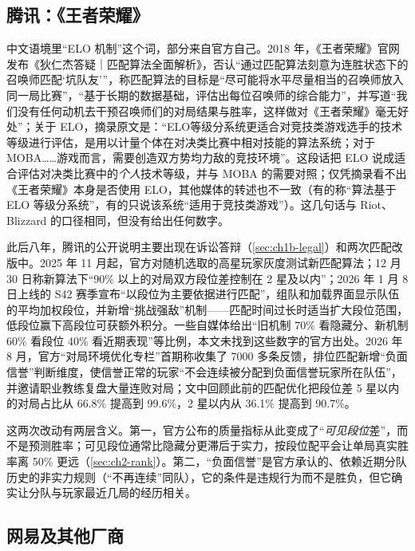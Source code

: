 \subsection{腾讯：《王者荣耀》}
\label{sec:ch1b-tencent}

中文语境里“ELO 机制”这个词，部分来自官方自己。2018 年，《王者荣耀》官网发布《狄仁杰答疑｜匹配算法全面解析》，否认“通过匹配算法刻意为连胜状态下的召唤师匹配‘坑队友’”，称匹配算法的目标是“尽可能将水平尽量相当的召唤师放入同一局比赛”，“基于长期的数据基础，评估出每位召唤师的综合能力”，并写道“我们没有任何动机去干预召唤师们的对局结果与胜率，这样做对《王者荣耀》毫无好处”；关于 ELO，摘录原文是：“ELO等级分系统更适合对竞技类游戏选手的技术等级进行评估，是用以计量个体在对决类比赛中相对技能的算法系统；对于MOBA……游戏而言，需要创造双方势均力敌的竞技环境”\cite{zhang2025hok}\tagOff{}。这段话把 ELO 说成适合评估对决类比赛中的\emph{个人}技术等级，并与 MOBA 的需要对照；仅凭摘录看不出《王者荣耀》本身是否使用 ELO，其他媒体的转述也不一致（有的称“算法基于 ELO 等级分系统”，有的只说该系统“适用于竞技类游戏”）。这几句话与 Riot、Blizzard 的口径相同，但没有给出任何数字。

此后八年，腾讯的公开说明主要出现在诉讼答辩（\cref{sec:ch1b-legal}）和两次匹配改版中。2025 年 11 月起，官方对随机选取的高星玩家灰度测试新匹配算法\cite{ithome2026hok}；12 月 30 日称新算法下“90\% 以上的对局双方段位差控制在 2 星及以内”；2026 年 1 月 8 日上线的 S42 赛季宣布“以段位为主要依据进行匹配”，组队和加载界面显示队伍的平均加权段位，并新增“挑战强敌”机制——匹配时间过长时适当扩大段位范围，低段位赢下高段位可获额外积分\cite{ithome2026s42}\tagOff。一些自媒体给出“旧机制 70\% 看隐藏分、新机制 60\% 看段位 40\% 看近期表现”等比例\cite{web17173_2025gray}\tagCom，本文未找到这些数字的官方出处。2026 年 8 月，官方“对局环境优化专栏”首期称收集了 7000 多条反馈，排位匹配新增“负面信誉”判断维度，使信誉正常的玩家“不会连续被分配到负面信誉玩家所在队伍”，并邀请职业教练复盘大量连败对局；文中回顾此前的匹配优化把段位差 5 星以内的对局占比从 66.8\% 提高到 99.6\%，2 星以内从 36.1\% 提高到 90.7\%\cite{kuaikeji2026hok}\tagOff{}。

这两次改动有两层含义。第一，官方公布的质量指标从此变成了“\emph{可见段位}差”，而不是预测胜率；可见段位通常比隐藏分更滞后于实力，按段位配平会让单局真实胜率离 50\% 更远（\cref{sec:ch2-rank}）。第二，“负面信誉”是官方承认的、依赖近期分队历史的非实力规则（“不再连续”同队），它的条件是违规行为而不是胜负，但它确实让分队与玩家最近几局的经历相关。

\subsection{网易及其他厂商}
\label{sec:ch1b-netease}

